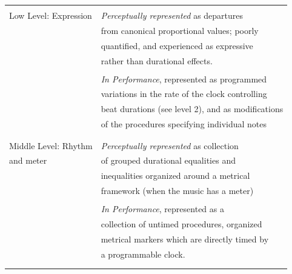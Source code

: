 \begin{table}
\begin{tabular}{|l|l|}\hline %
& \\
Low Level: Expression  & {\it Perceptually represented} as departures \\
                       & from canonical proportional values; poorly \\
                       & quantified, and experienced as expressive \\ 
                       & rather than durational effects. \\ 
                       &  \\
                       & {\it In Performance}, represented as programmed\\
                       & variations in the rate of the clock controlling\\
                       & beat durations (see level 2), and as modifications\\
                       & of the procedures specifying individual notes\\
                       & \\ \hline
                       & \\

Middle Level: Rhythm   & {\it Perceptually represented} as collection \\
and meter              & of grouped durational equalities and \\
                       & inequalities organized around a metrical \\
                       & framework (when the music has a meter) \\
                       &  \\
                       & {\it In Performance}, represented as a \\
                       & collection of untimed procedures, organized \\
                       & metrical markers which are directly timed by \\
                       & a programmable clock. \\
                       & \\ \hline
                       &  \\


\end{tabular}
\end{table}
